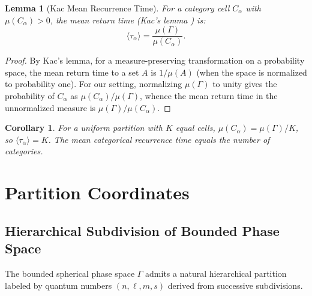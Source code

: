 \documentclass[11pt,twocolumn,a4paper]{article}
\newtheorem{lemma}[theorem]{Lemma}
\newtheorem{corollary}[theorem]{Corollary}
\begin{document}
\begin{lemma}[Kac Mean Recurrence Time]
\label{lem:kac}
For a category cell $C_\alpha$ with $\mu(C_\alpha) > 0$, the mean
return time (Kac's lemma \citep{kac1947}) is:
\begin{equation}
\langle \tau_\alpha \rangle
  = \frac{\mu(\Gamma)}{\mu(C_\alpha)}.
\label{eq:kac}
\end{equation}
\end{lemma}

\begin{proof}
By Kac's lemma, for a measure-preserving transformation on a
probability space, the mean return time to a set $A$ is $1/\mu(A)$
(when the space is normalized to probability one). For our setting,
normalizing $\mu(\Gamma)$ to unity gives the probability of $C_\alpha$
as $\mu(C_\alpha)/\mu(\Gamma)$, whence the mean return time in the
unnormalized measure is $\mu(\Gamma)/\mu(C_\alpha)$.
\end{proof}

\begin{corollary}
\label{cor:kac-uniform}
For a uniform partition with $K$ equal cells, $\mu(C_\alpha) =
\mu(\Gamma)/K$, so $\langle \tau_\alpha \rangle = K$. The mean
categorical recurrence time equals the number of categories.
\end{corollary}



\section{Partition Coordinates}
\label{sec:partition}

\subsection{Hierarchical Subdivision of Bounded Phase Space}

The bounded spherical phase space $\Gamma$ admits a natural
hierarchical partition labeled by quantum numbers $(n, \ell, m, s)$
derived from successive subdivisions.
\end{document}

